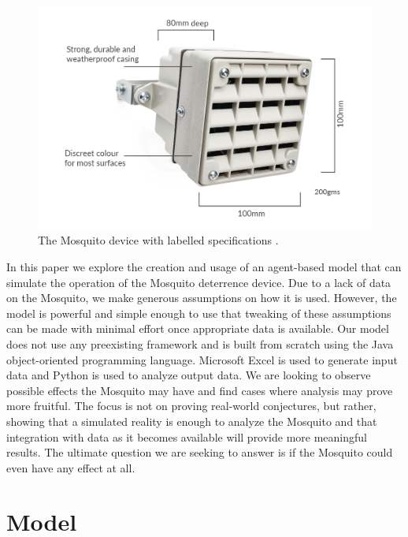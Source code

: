 \documentclass[twocolumn,11pt]{article}
\begin{document}
\begin{figure}[h]
    \centering
    \includegraphics[width=1.0\columnwidth]{mosquito.png}
    \caption{The Mosquito device with labelled specifications \citep{mosquitoimage}.}
    \label{fig:mosquito}
\end{figure}


In this paper we explore the creation and usage of an agent-based model that can simulate the operation of the Mosquito deterrence device. Due to a lack of data on the Mosquito, we make generous assumptions on how it is used. However, the model is powerful and simple enough to use that tweaking of these assumptions can be made with minimal effort once appropriate data is available. Our model does not use any preexisting framework and is built from scratch using the Java object-oriented programming language. Microsoft Excel is used to generate input data and Python is used to analyze output data. We are looking to observe possible effects the Mosquito may have and find cases where analysis may prove more fruitful. The focus is not on proving real-world conjectures, but rather, showing that a simulated reality is enough to analyze the Mosquito and that integration with data as it becomes available will provide more meaningful results. The ultimate question we are seeking to answer is if the Mosquito could even have any effect at all.

\section*{Model}
\end{document}
